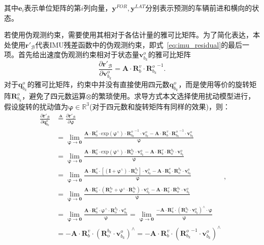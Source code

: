 其中$\symbf{e}_i$表示单位矩阵的第$i$列向量，$\symbf{y}^{FOR}, \symbf{y}^{LAT}$分别表示预测的车辆前进和横向的状态。

若使用伪观测约束，需要使用其相对于各估计量的雅可比矩阵。为了简化表达，本处使用$\symbf{r}'_{\mathcal{B}}$代表IMU残差函数中的伪观测约束，即式~\ref{eq:imu_residual}的最后一项。首先给出速度伪观测约束相对于状态量$\symbf{v}_{b_{k}}^o$的雅可比矩阵
\begin{equation}
  \frac{\partial \symbf{r}'_{\mathcal{B}}}{\partial \symbf{v}_{b_{k}}^o} = \symbf{A} \cdot \symbf{R}_b^v \cdot {\symbf{R}_{b_k}^o}^{-1}.
\end{equation}
对于$\symbf{q}_{b_{k}}^o$的雅可比矩阵，约束中并没有直接使用四元数$\symbf{q}_{b_{k}}^o$，而是使用等价的旋转矩阵$\symbf{R}_{b_{k}}^o$，避免了四元数运算$\otimes$的繁琐使用。求导方式本文选择使用扰动模型\cite{imu_preintegration}进行，假设旋转的扰动值为$\symbf{\varphi } \in \mathbb{R}^3$(对于四元数和旋转矩阵有同样的效果)，则：
\begin{equation}
\begin{aligned}
  \frac{\partial \symbf{r}'_{\mathcal{B}}}{\partial \symbf{q}_{b_{k}}^o} &\triangleq  \frac{\partial \symbf{r}'_{\mathcal{B}}}{\partial \symbf{\varphi }} \\
  &= \lim\limits_{\symbf{\varphi } \to \symbf{0}} \frac{\symbf{A} \cdot \symbf{R}_b^v \cdot {\text{exp}(\symbf{\varphi }^{\land}) \cdot {\symbf{R}_{b_k}^o}^{-1}} \cdot \symbf{v}_{b_k}^o - \symbf{A} \cdot \symbf{R}_b^v \cdot {{\symbf{R}_{b_k}^o}^{-1}} \cdot \symbf{v}_{b_k}^o}{\symbf{\varphi }} \\
  &= \lim\limits_{\symbf{\varphi } \to \symbf{0}} \frac{\symbf{A} \cdot \symbf{R}_b^v \cdot {\text{exp}(\symbf{\varphi }^{\land}) \cdot \symbf{R}^{b_k}_o} \cdot \symbf{v}_{b_k}^o - \symbf{A} \cdot \symbf{R}_b^v \cdot {\symbf{R}^{b_k}_o} \cdot \symbf{v}_{b_k}^o}{\symbf{\varphi }} \\
  &= \lim\limits_{\symbf{\varphi } \to \symbf{0}} \frac{\symbf{A} \cdot \symbf{R}_b^v \cdot {[(\symbf{I} + \symbf{\varphi }^{\land}) \cdot \symbf{R}^{b_k}_o]} \cdot \symbf{v}_{b_k}^o - \symbf{A} \cdot \symbf{R}_b^v \cdot {\symbf{R}^{b_k}_o} \cdot \symbf{v}_{b_k}^o}{\symbf{\varphi }} \\
  &= \lim\limits_{\symbf{\varphi } \to \symbf{0}} \frac{\symbf{A} \cdot \symbf{R}_b^v \cdot {({\symbf{R}^{b_k}_o} + \symbf{\varphi }^{\land} \cdot \symbf{R}^{b_k}_o)} \cdot \symbf{v}_{b_k}^o - \symbf{A} \cdot \symbf{R}_b^v \cdot {\symbf{R}^{b_k}_o} \cdot \symbf{v}_{b_k}^o}{\symbf{\varphi }} \\
  &= \lim\limits_{\symbf{\varphi } \to \symbf{0}} \frac{\symbf{A} \cdot \symbf{R}_b^v \cdot {\symbf{\varphi }^{\land} \cdot \symbf{R}^{b_k}_o} \cdot \symbf{v}_{b_k}^o}{\symbf{\varphi }}
  = \lim\limits_{\symbf{\varphi } \to \symbf{0}} \frac{-\symbf{A} \cdot \symbf{R}_b^v \cdot ({\symbf{R}^{b_k}_o} \cdot \symbf{v}_{b_k}^{o})^{\land} \cdot \symbf{\varphi}}{\symbf{\varphi }} \\
  &= -\symbf{A} \cdot \symbf{R}_b^v \cdot ({\symbf{R}^{b_k}_o} \cdot \symbf{v}_{b_k}^{o})^{\land}
  = -\symbf{A} \cdot \symbf{R}_b^v \cdot ({\symbf{R}_{b_k}^o}^{-1} \cdot \symbf{v}_{b_k}^{o})^{\land}
\end{aligned},
\end{equation}
